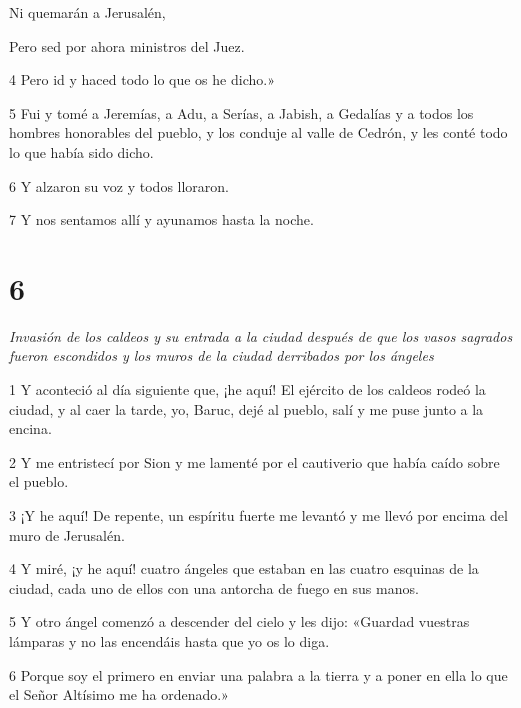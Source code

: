 \par Ni quemarán a Jerusalén,

\par Pero sed por ahora ministros del Juez.

\par 4 Pero id y haced todo lo que os he dicho.»


\par 5 Fui y tomé a Jeremías, a Adu, a Serías, a Jabish, a Gedalías y a todos los hombres honorables del pueblo, y los conduje al valle de Cedrón, y les conté todo lo que había sido dicho.

\par 6 Y alzaron su voz y todos lloraron.

\par 7 Y nos sentamos allí y ayunamos hasta la noche.

\chapter{6}

\par \textit{Invasión de los caldeos y su entrada a la ciudad después de que los vasos sagrados fueron escondidos y los muros de la ciudad derribados por los ángeles}

\par 1 Y aconteció al día siguiente que, ¡he aquí! El ejército de los caldeos rodeó la ciudad, y al caer la tarde, yo, Baruc, dejé al pueblo, salí y me puse junto a la encina.

\par 2 Y me entristecí por Sion y me lamenté por el cautiverio que había caído sobre el pueblo.

\par 3 ¡Y he aquí! De repente, un espíritu fuerte me levantó y me llevó por encima del muro de Jerusalén.

\par 4 Y miré, ¡y he aquí! cuatro ángeles que estaban en las cuatro esquinas de la ciudad, cada uno de ellos con una antorcha de fuego en sus manos.

\par 5 Y otro ángel comenzó a descender del cielo y les dijo: «Guardad vuestras lámparas y no las encendáis hasta que yo os lo diga.

\par 6 Porque soy el primero en enviar una palabra a la tierra y a poner en ella lo que el Señor Altísimo me ha ordenado.»

